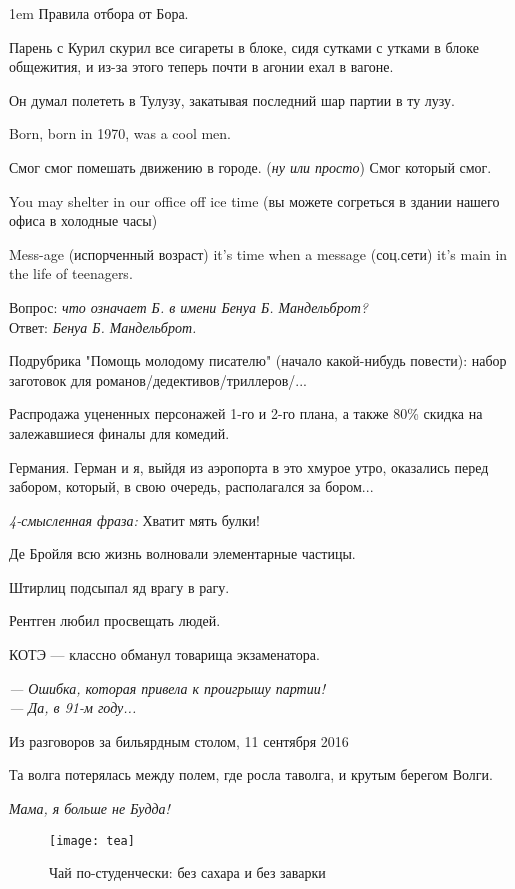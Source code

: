 \begin{flushleft}\parskip1em
    Правила отбора от Бора.

    Парень с Курил скурил все сигареты в блоке, сидя сутками с утками в блоке общежития, и из-за этого теперь почти в агонии ехал в вагоне.

    Он думал полететь в Тулузу, закатывая последний шар партии в ту лузу.

    Born, born in 1970, was a cool men.

    Смог смог помешать движению в городе. (\emph{ну или просто}) Смог который смог.

    You may shelter in our office off ice time (вы можете согреться в здании нашего офиса в холодные часы)

    Mess-age (испорченный возраст) it's time when a message (соц.сети) it's main in the life of teenagers.

    Вопрос: \emph{что означает Б. в имени Бенуа Б. Мандельброт?}\\
    Ответ: \emph{Бенуа Б. Мандельброт.}

    Подрубрика "Помощь молодому писателю" (начало какой-нибудь повести): набор заготовок для романов/дедективов/триллеров/...

    Распродажа уцененных персонажей 1-го и 2-го плана, а также 80\% скидка на залежавшиеся финалы для комедий.

    Германия. Герман и я, выйдя из аэропорта в это хмурое утро, оказались перед забором, который, в свою очередь, располагался за бором...

    \emph{4-смысленная фраза:} Хватит мять булки!

    Де Бройля всю жизнь волновали элементарные частицы.

    Штирлиц подсыпал яд врагу в рагу.

    Рентген любил просвещать людей.

    КОТЭ --- классно обманул товарища экзаменатора.

    \emph{--- Ошибка, которая привела к проигрышу партии!\\
    --- Да, в 91-м году...}
    \vspace*{-1em}\begin{flushright}
        Из разговоров за бильярдным столом, 11 сентября 2016
    \end{flushright}

    Та волга потерялась между полем, где росла таволга, и крутым берегом Волги. %

    \emph{Мама, я больше не Будда!}
\end{flushleft}
\begin{figure}[ht!]
    \centering
    \texttt{[image: tea]}
    \caption{Чай по-студенчески: без сахара и без заварки}
\end{figure}

